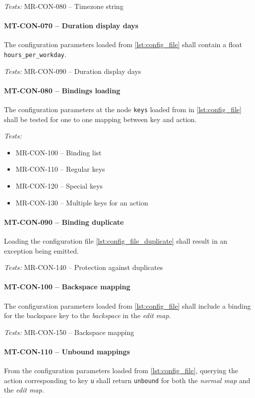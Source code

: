\textit{Tests: } MR-CON-080 -- Timezone string

\paragraph{MT-CON-070 -- Duration display days}
The configuration parameters loaded from \cref{lst:config_file}
shall contain a float \lstinline{hours_per_workday}.

\textit{Tests: } MR-CON-090 -- Duration display days

\paragraph{MT-CON-080 -- Bindings loading}
The configuration parameters at the node \lstinline{keys} loaded from
in \cref{lst:config_file} shall be tested for one to one mapping between
key and action.

\textit{Tests: }
\begin{itemize}
\item MR-CON-100 -- Binding list
\item MR-CON-110 -- Regular keys
\item MR-CON-120 -- Special keys
\item MR-CON-130 -- Multiple keys for an action
\end{itemize}

\paragraph{MT-CON-090 -- Binding duplicate}
Loading the configuration file \cref{lst:config_file_duplicate} shall
result in an exception being emitted.

\textit{Tests: } MR-CON-140 -- Protection against duplicates

\paragraph{MT-CON-100 -- Backspace mapping}
The configuration parameters loaded from \cref{lst:config_file}
shall include a binding for the backspace key to the \emph{backspace}
in the \emph{edit map}.

\textit{Tests: } MR-CON-150 -- Backspace mapping

\paragraph{MT-CON-110 -- Unbound mappings}
From the configuration parameters loaded from \cref{lst:config_file},
querying the action corresponding to key \lstinline{u} shall return
\lstinline{unbound} for both the \emph{normal map} and the \emph{edit map}.

